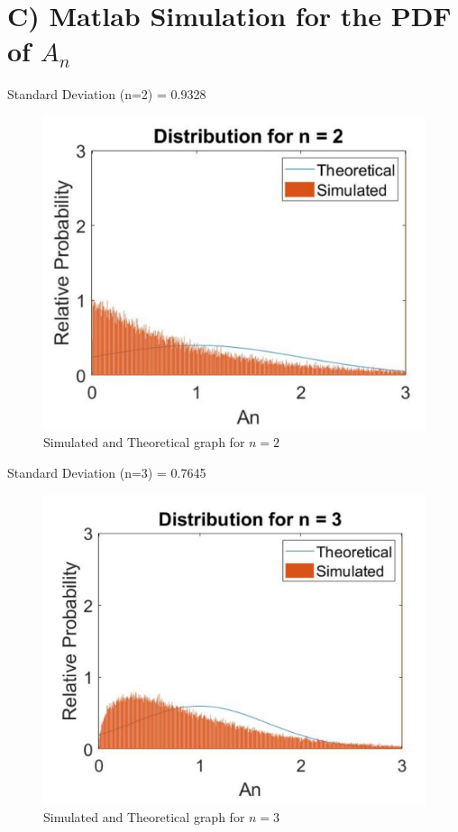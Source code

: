 \documentclass{article}
\begin{document}
\section*{C) Matlab Simulation for the PDF 
of $A_n$}
Standard Deviation (n=2) = 0.9328
\begin{figure}[h!]
\centering
\includegraphics[scale=0.75]{Cpart1.jpg}
\caption{Simulated and Theoretical graph for $n = 2$}
\end{figure}

Standard Deviation (n=3) = 0.7645
\begin{figure}[h!]
\centering
\includegraphics[scale=0.9]{Cpart1_2.jpg}
\caption{Simulated and Theoretical graph for $n = 3$}
\end{figure}
\end{document}

